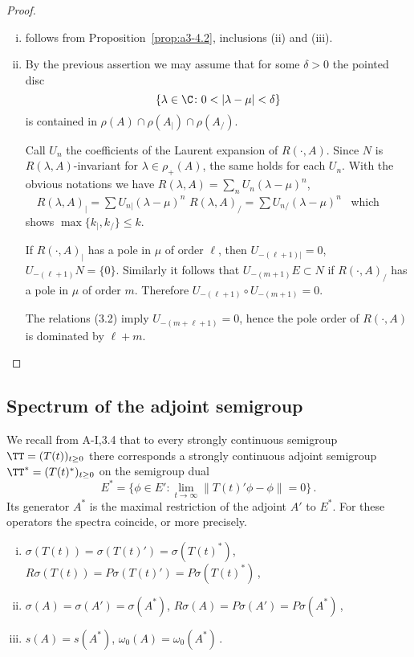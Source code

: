 \begin{proof}
\begin{enumerate}[(i), wide]
\item 
follows from Proposition~\ref{prop:a3-4.2}, inclusions (ii) and (iii).

\item 
By the previous assertion we may assume that for some $\delta > 0$ the pointed disc
\[
\{\lambda \in \C \colon 0 < |\lambda-\mu| < \delta\}
\]
is contained in $\rho(A) \cap \rho(A_{|}) \cap \rho(A_{/})$.

Call $U_{n}$ the coefficients of the Laurent expansion of $R(\cdot,A)$.
Since $N$ is $R(\lambda,A)$-invariant for $\lambda \in \rho_{+}(A)$, the same holds for each $U_{n}$.
With the obvious notations we have \quad
$R(\lambda,A) = \sum_{n} U_{n}(\lambda-\mu)^{n}$, $\quad R(\lambda,A)_{|} = \sum U_{n|}(\lambda-\mu)^{n}$ \quad {} \quad $R(\lambda,A)_{/} = \sum U_{n/}(\lambda-\mu)^{n}$~
which shows $\max\{k_{|},k_{/}\} \leq k$.

If $R(\cdot,A)_{|}$ has a pole in $\mu$ of order $\ell$, then $U_{-(\ell+1)|} = 0$, \ie $U_{-(\ell+1)}N = \{0\}$.
Similarly it follows that $U_{-(m+1)}E \subset N$ if $R(\cdot,A)_{/}$ has a pole in $\mu$ of order $m$.
Therefore $U_{-(\ell+1)} \circ U_{-(m+1)} = 0$.

The relations (3.2) imply $U_{-(m+\ell+1)} = 0$, hence the pole order of $R(\cdot,A)$ is dominated by $\ell + m$.
\end{enumerate}
\end{proof}

\subsection{Spectrum of the adjoint semigroup}\label{subsec:a3-4.4}
We recall from A-I,3.4 that to every strongly continuous semigroup $\TT = (T(t))_{t \geq 0}$ there corresponds a strongly continuous adjoint semigroup $\TT^* = (T(t)^*)_{t \geq 0}$ on the semigroup dual
\[
E^* = \{\phi \in E' \colon \lim_{t \to \infty} \|T(t)'\phi-\phi\| = 0\}\,.
\]
Its generator $A^*$ is the maximal restriction of the adjoint $A'$ to $E^*$.
For these operators the spectra coincide, or more precisely.
\begin{enumerate}[(i)]
\item 
$\sigma(T(t)) = \sigma(T(t)') = \sigma(T(t)^*)$,\\
$R\sigma(T(t)) = P\sigma(T(t)') = P\sigma(T(t)^*)$\,,

\item 
$\sigma(A) = \sigma(A') = \sigma(A^*)$, $R\sigma(A) = P\sigma(A') = P\sigma(A^*)$\,,
\item 
$s(A) = s(A^*)$, $\omega_{0}(A) = \omega_{0}(A^*)$\,.
\end{enumerate}

